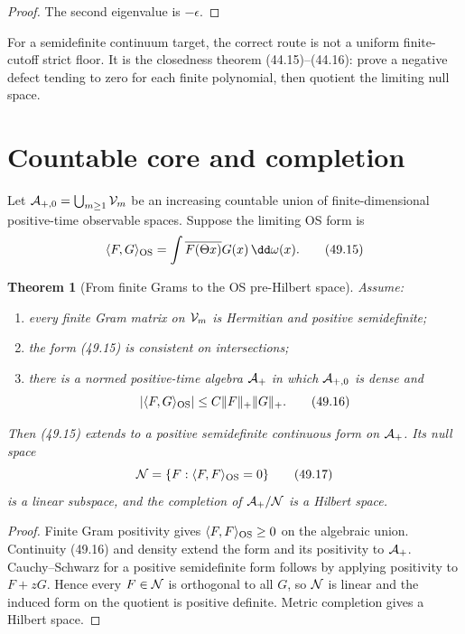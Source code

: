 \documentclass[11pt]{article}
\newtheorem{theorem}{Theorem}[section]
\theoremstyle{remark}
\begin{document}
\begin{proof}
The second eigenvalue is \(-\epsilon\).
\end{proof}

For a semidefinite continuum target, the correct route is not a
uniform finite-cutoff strict floor.  It is the closedness theorem
(44.15)--(44.16): prove a negative defect tending to zero for each
finite polynomial, then quotient the limiting null space.

\section{Countable core and completion}

Let
\({\cal A}_{+,0}=\bigcup_{m\geq1}{\cal V}_m\) be an increasing
countable union of finite-dimensional positive-time observable
spaces.  Suppose the limiting OS form is
\[
 \langle F,G\rangle_{\rm OS}
 =\int\overline{F(\Theta x)}G(x)\,\dd\omega(x).          \tag{49.15}
\]

\begin{theorem}[From finite Grams to the OS pre-Hilbert space]
\label{thm:v15v49-completion}
Assume:
\begin{enumerate}
\item every finite Gram matrix on \({\cal V}_m\) is Hermitian and
      positive semidefinite;
\item the form (49.15) is consistent on intersections;
\item there is a normed positive-time algebra \({\cal A}_+\) in
      which \({\cal A}_{+,0}\) is dense and
      \[
       |\langle F,G\rangle_{\rm OS}|
       \leq C\|F\|_+\|G\|_+.                             \tag{49.16}
      \]
\end{enumerate}
Then (49.15) extends to a positive semidefinite continuous form on
\({\cal A}_+\).  Its null space
\[
 {\cal N}=\{F:\langle F,F\rangle_{\rm OS}=0\}            \tag{49.17}
\]
is a linear subspace, and the completion of
\({\cal A}_+/{\cal N}\) is a Hilbert space.
\end{theorem}

\begin{proof}
Finite Gram positivity gives
\(\langle F,F\rangle_{\rm OS}\geq0\) on the algebraic union.
Continuity (49.16) and density extend the form and its positivity to
\({\cal A}_+\).  Cauchy--Schwarz for a positive semidefinite form
follows by applying positivity to \(F+zG\).  Hence every
\(F\in{\cal N}\) is orthogonal to all \(G\), so \({\cal N}\) is
linear and the induced form on the quotient is positive definite.
Metric completion gives a Hilbert space.
\end{proof}
\end{document}
